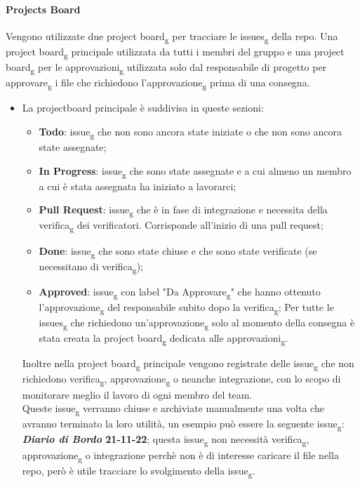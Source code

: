 \paragraph{Projects Board}
Vengono utilizzate due project board\textsubscript{g} per tracciare le issues\textsubscript{g} della repo.
Una project board\textsubscript{g} principale utilizzata da tutti i membri del gruppo e una project board\textsubscript{g} per le approvazioni\textsubscript{g} utilizzata solo dal responsabile di progetto per approvare\textsubscript{g} i file che richiedono l'approvazione\textsubscript{g} prima di una consegna.

\begin{itemize}
	\item La projectboard principale è suddivisa in queste sezioni:
	\begin{itemize}
		\item \textbf{Todo}: issue\textsubscript{g} che non sono ancora state iniziate o che non sono ancora state assegnate;
		\item \textbf{In Progress}: issue\textsubscript{g} che sono state assegnate e a cui almeno un membro a cui è stata assegnata ha iniziato a lavorarci;
		\item \textbf{Pull Request}: issue\textsubscript{g} che è in fase di integrazione e necessita della verifica\textsubscript{g} dei verificatori. Corrisponde all'inizio di una pull request;
		\item \textbf{Done}: issue\textsubscript{g} che sono state chiuse e che sono state verificate (se necessitano di verifica\textsubscript{g});
		\item \textbf{Approved}: issue\textsubscript{g} con label "Da Approvare\textsubscript{g}" che hanno ottenuto l'approvazione\textsubscript{g} del responsabile subito dopo la verifica\textsubscript{g};
		Per tutte le issues\textsubscript{g} che richiedono un'approvazione\textsubscript{g} solo al momento della consegna è stata creata la project board\textsubscript{g} dedicata alle approvazioni\textsubscript{g}.
	\end{itemize}
	Inoltre nella project board\textsubscript{g} principale vengono registrate delle issue\textsubscript{g} che non richiedono verifica\textsubscript{g}, approvazione\textsubscript{g} o neanche integrazione, con lo scopo di monitorare meglio il lavoro di ogni membro del team.\\
Queste issue\textsubscript{g} verranno chiuse e archiviate manualmente una volta che avranno terminato la loro utilità, un esempio può essere la seguente issue\textsubscript{g}:\\
\textbf{\textit{Diario di Bordo} 21-11-22}; questa issue\textsubscript{g} non necessità verifica\textsubscript{g}, approvazione\textsubscript{g} o integrazione perchè non è di interesse caricare il file nella repo, però è utile tracciare lo svolgimento della issue\textsubscript{g}.


\end{itemize}
